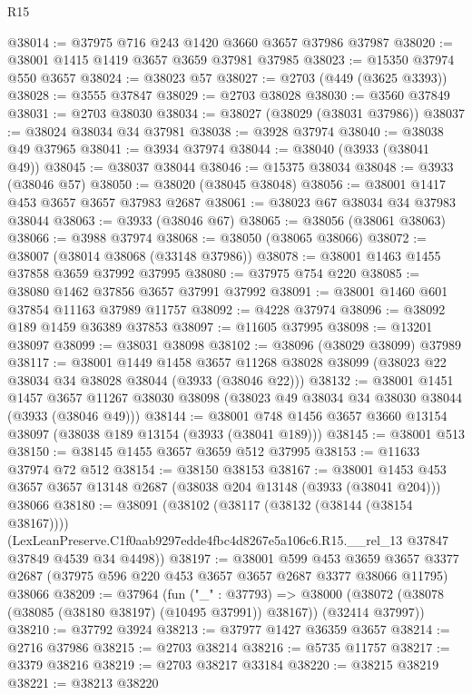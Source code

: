 \begin{lexlean}{R15}
\begin{coremodule}
@38014 := @37975 @716 @243 @1420 @3660 @3657 @37986 @37987
@38020 := @38001 @1415 @1419 @3657 @3659 @37981 @37985
@38023 := @15350 @37974 @550 @3657
@38024 := @38023 @57
@38027 := @2703 (@449 (@3625 @3393))
@38028 := @3555 @37847
@38029 := @2703 @38028
@38030 := @3560 @37849
@38031 := @2703 @38030
@38034 := @38027 (@38029 (@38031 @37986))
@38037 := @38024 @38034 @34 @37981
@38038 := @3928 @37974
@38040 := @38038 @49 @37965
@38041 := @3934 @37974
@38044 := @38040 (@3933 (@38041 @49))
@38045 := @38037 @38044
@38046 := @15375 @38034
@38048 := @3933 (@38046 @57)
@38050 := @38020 (@38045 @38048)
@38056 := @38001 @1417 @453 @3657 @3657 @37983 @2687
@38061 := @38023 @67 @38034 @34 @37983 @38044
@38063 := @3933 (@38046 @67)
@38065 := @38056 (@38061 @38063)
@38066 := @3988 @37974
@38068 := @38050 (@38065 @38066)
@38072 := @38007 (@38014 @38068 (@33148 @37986))
@38078 := @38001 @1463 @1455 @37858 @3659 @37992 @37995
@38080 := @37975 @754 @220
@38085 := @38080 @1462 @37856 @3657 @37991 @37992
@38091 := @38001 @1460 @601 @37854 @11163 @37989 @11757
@38092 := @4228 @37974
@38096 := @38092 @189 @1459 @36389 @37853
@38097 := @11605 @37995
@38098 := @13201 @38097
@38099 := @38031 @38098
@38102 := @38096 (@38029 @38099) @37989
@38117 := @38001
    @1449
    @1458
    @3657
    @11268
    @38028
    @38099
    (@38023 @22 @38034 @34 @38028 @38044 (@3933 (@38046 @22)))
@38132 := @38001
    @1451
    @1457
    @3657
    @11267
    @38030
    @38098
    (@38023 @49 @38034 @34 @38030 @38044 (@3933 (@38046 @49)))
@38144 := @38001 @748 @1456 @3657 @3660 @13154 @38097 (@38038 @189 @13154 (@3933 (@38041 @189)))
@38145 := @38001 @513
@38150 := @38145 @1455 @3657 @3659 @512 @37995
@38153 := @11633 @37974 @72 @512
@38154 := @38150 @38153
@38167 := @38001
    @1453
    @453
    @3657
    @3657
    @13148
    @2687
    (@38038 @204 @13148 (@3933 (@38041 @204)))
    @38066
@38180 := @38091
    (@38102
      (@38117 (@38132 (@38144 (@38154 @38167))))
      (LexLeanPreserve.C1f0aab9297edde4fbc4d8267e5a106c6.R15.__rel_13
        @37847
        @37849
        @4539
        @34
        @4498))
@38197 := @38001
    @599
    @453
    @3659
    @3657
    @3377
    @2687
    (@37975 @596 @220 @453 @3657 @3657 @2687 @3377 @38066 @11795)
    @38066
@38209 := @37964
    (fun ("_" : @37793) =>
    @38000 (@38072 (@38078 (@38085 (@38180 @38197) (@10495 @37991)) @38167)) (@32414 @37997))
@38210 := @37792 @3924
@38213 := @37977 @1427 @36359 @3657
@38214 := @2716 @37986
@38215 := @2703 @38214
@38216 := @5735 @11757
@38217 := @3379 @38216
@38219 := @2703 @38217 @33184
@38220 := @38215 @38219
@38221 := @38213 @38220

\end{coremodule}
\end{lexlean}
